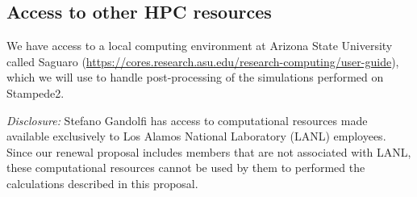 \documentclass[12pt,letterpaper]{article}
\begin{document}
\subsection{Access to other HPC resources}

We have access to a local computing environment at Arizona State
University called Saguaro (\url{https://cores.research.asu.edu/research-computing/user-guide}), which we will use to handle post-processing of the
simulations performed on Stampede2.

\textit{Disclosure:} Stefano Gandolfi has access to
computational resources made available 
exclusively to Los Alamos National Laboratory (LANL) employees. Since our 
renewal proposal includes members that are not associated with LANL, these 
computational resources cannot be used by them to performed the calculations 
described in this proposal.

\vspace*{-0.5cm}



\end{document}
